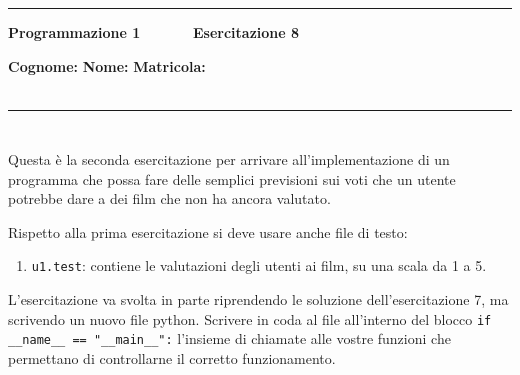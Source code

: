 \documentclass[11pt,a4]{article}
\begin{document}
\thispagestyle{empty}
\hrule
\begin{center}
   {\Large {\bf Programmazione 1 \hspace{3cm} $\quad \quad \quad$ Esercitazione 8}}
\end{center}
{\bf Cognome: }\hspace{2.5cm} {\bf Nome: } \hspace{2.5cm} {\bf Matricola: } \\\
\hrule

\section*{}
Questa è la seconda esercitazione per arrivare all'implementazione di un programma che possa fare delle semplici previsioni
sui voti che un utente potrebbe dare a dei film che non ha ancora valutato.

Rispetto alla prima esercitazione si deve usare anche file di testo:
\begin{enumerate}
\item {\tt u1.test}: contiene le valutazioni degli utenti ai film, su una scala da 1 a 5. 
\end{enumerate}

L'esercitazione va svolta in parte riprendendo le soluzione dell'esercitazione 7, ma scrivendo un nuovo file python.
Scrivere in coda al file all'interno del blocco {\tt if \_\_name\_\_ == "\_\_main\_\_":} l'insieme di chiamate alle vostre funzioni
che permettano di controllarne il corretto funzionamento.
\end{document}

